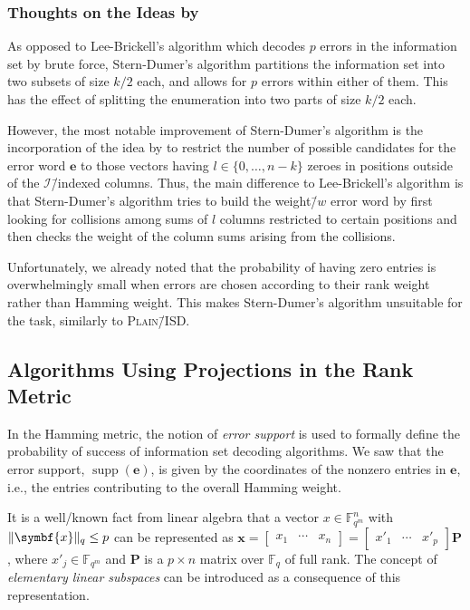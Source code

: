 \documentclass[version=last, paper=A4, parskip=half, oneside,%
toc=bibliography, toc=listof, listof=leveldown]{scrbook}
\theoremstyle{plain}
\theoremstyle{definition}
\theoremstyle{remark}
\renewcommand*{\vec}{\symbf}
\newcommand*{\mat}{\symbf}
\DeclareMathOperator{\supp}{supp}
\newcommand*{\FF}{\ensuremath{\mathbb{F}}}
\DeclarePairedDelimiter{\norm}{\lVert}{\rVert}
\newcommand*{\normR}[2]{\ensuremath{\norm{#1}_{#2}}}
\newcommand*{\PISD}{\textsc{Plain}\=/ISD}
\begin{document}
\subsubsection{Thoughts on the Ideas by \texorpdfstring{\textcite{Ste89,
      Dum96}}{Stern and Dumer}}

As opposed to Lee\--Brickell's algorithm which decodes \(p\) errors in the
information set by brute force, Stern\--Dumer's algorithm partitions the
information set into two subsets of size \(k / {2}\) each, and allows for \(p\)
errors within either of them.  This has the effect of splitting the enumeration
into two parts of size \(k / {2}\) each.

However, the most notable improvement of Stern\--Dumer's algorithm is the
incorporation of the idea by \textcite{Leo88} to restrict the number of
possible candidates for the error word \(\vec{e}\) to those vectors having
\(l \in \{0, \ldots, n - k\}\) zeroes in positions outside of the
\(\mathcal{I}\)\=/indexed columns.  Thus, the main difference to
Lee\--Brickell's algorithm is that Stern\--Dumer's algorithm tries to build the
weight\=/\(w\) error word by first looking for collisions among sums of \(l\)
columns restricted to certain positions and then checks the weight of the
column sums arising from the collisions.

Unfortunately, we already noted that the probability of having zero entries is
overwhelmingly small when errors are chosen according to their rank weight
rather than Hamming weight.  This makes Stern\--Dumer's algorithm unsuitable
for the task, similarly to \PISD\@.

\subsection{Algorithms Using Projections in the Rank Metric}\label{sec:ISD-R-P}

In the Hamming metric, the notion of \emph{error support} is used to formally
define the probability of success of information set decoding algorithms.  We
saw that the error support, \(\supp(\vec{e})\), is given by the coordinates of
the nonzero entries in \(\vec{e}\), i.e., the entries contributing to the
overall Hamming weight.

It is a well\-/known fact from linear algebra that a vector
\(x \in \FF_{q^m}^n\) with \(\normR{\vec{x}}{q} \le p\) can be represented as
\(\vec{x} =
\begin{bmatrix} x_1 & \cdots & x_n \end{bmatrix} =
\begin{bmatrix} x'_1 & \cdots & x'_p \end{bmatrix} \mat{P}\), where
\(x'_j \in \FF_{q^m}\) and \(\mat{P}\) is a \(p \times n\) matrix over
\(\FF_q\) of full rank.  The concept of \emph{elementary linear subspaces} can
be introduced as a consequence of this representation.
\end{document}
